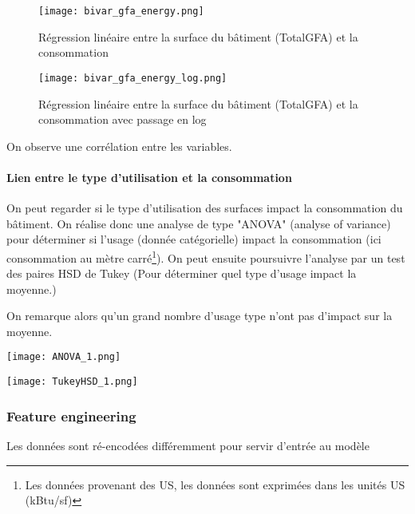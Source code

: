\begin{figure}[H]
  \texttt{[image: bivar\_gfa\_energy.png]}
  \caption{Régression linéaire entre la surface du bâtiment (TotalGFA) et la
  consommation}
  \label{}
\end{figure}

\begin{figure}[H]
  \texttt{[image: bivar\_gfa\_energy\_log.png]}
  \caption{Régression linéaire entre la surface du bâtiment (TotalGFA) et la
  consommation avec passage en log}
  \label{}
\end{figure}

On observe une corrélation entre les variables.



\paragraph{Lien entre le type d'utilisation et la consommation}
On peut regarder si le type d'utilisation des surfaces impact la consommation du bâtiment.
On réalise donc une analyse de type "ANOVA" \cite{rutherford2001introducing}(analyse of variance) pour déterminer
si l'usage (donnée catégorielle) impact la consommation (ici consommation au mètre carré\footnote{Les données provenant des US, les données sont exprimées dans les unités US (kBtu/sf)}). On peut ensuite poursuivre l'analyse par
un test des paires HSD de Tukey \cite{abdi2020} (Pour déterminer quel type d'usage impact la moyenne.)

On remarque alors qu'un grand nombre d'usage type n'ont pas d'impact sur la moyenne.


\begin{figure*}
  \texttt{[image: ANOVA\_1.png]}
  \caption{}
  \label{}
\end{figure*}
\begin{figure*}
  \texttt{[image: TukeyHSD\_1.png]}
  \caption{}
  \label{}
\end{figure*}




\subsubsection{Feature engineering}

Les données sont ré-encodées différemment pour servir d'entrée au modèle




